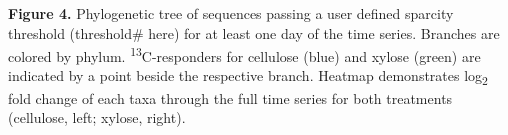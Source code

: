 \textbf{Figure 4.} Phylogenetic tree of sequences passing a user defined sparcity threshold (threshold# here) for at least one day of the time series. Branches are colored by phylum. \textsuperscript{13}C-responders for cellulose (blue) and xylose (green) are indicated by a point beside the respective branch. Heatmap demonstrates log\textsubscript{2} fold change of each taxa through the full time series for both treatments (cellulose, left; xylose, right).        